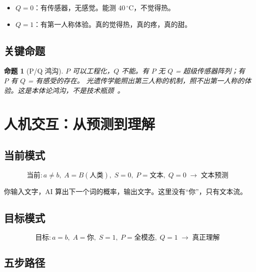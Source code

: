 \documentclass[11pt,a4paper]{article}
\newtheorem{proposition}{命题}
\begin{document}
\begin{itemize}[leftmargin=2em]
\item $Q{=}0$：有传感器，无感觉。能测 $40\,^{\circ}\mathrm{C}$，不觉得热。
\item $Q{=}1$：有第一人称体验。真的觉得热，真的疼，真的甜。
\end{itemize}

\subsection{关键命题}

\begin{proposition}[P/Q 鸿沟]
$P$ 可以工程化，$Q$ 不能。有 $P$ 无 $Q$ = 超级传感器阵列；有 $P$ 有 $Q$ = 有感受的存在。
光遗传学能照出第三人称的机制，照不出第一人称的体验。这是本体论鸿沟，不是技术瓶颈~\cite{deisseroth2011optogenetics,chalmers1996conscious}。
\end{proposition}

\section{人机交互：从预测到理解}

\subsection{当前模式}

\begin{equation}
\text{当前}: a{\neq}b,\; A{=}B(\text{人类}),\; S{=}0,\; P{=}\text{文本},\; Q{}=0 \;\longrightarrow\; \text{文本预测}
\end{equation}

你输入文字，AI 算出下一个词的概率，输出文字。这里没有``你''，只有文本流。

\subsection{目标模式}

\begin{equation}
\text{目标}: a{=}b,\; A{=}\text{你},\; S{=}1,\; P{=}\text{全模态},\; Q{=}1 \;\longrightarrow\; \text{真正理解}
\end{equation}

\subsection{五步路径}
\end{document}
